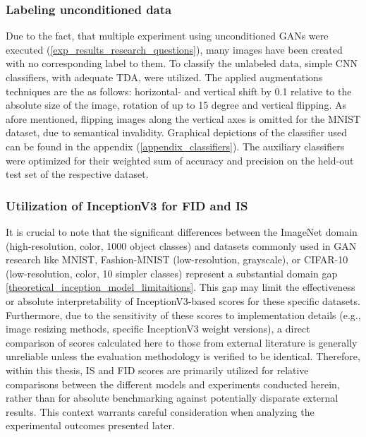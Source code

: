 \subsubsection{Labeling unconditioned data}\label{body_experiment_labeling_data}
Due to the fact, that multiple experiment using unconditioned GANs were executed (\ref{exp_results_research_questions}), many images have been created with no corresponding label to them. To classify the unlabeled data, simple CNN classifiers, with adequate TDA, were utilized. The applied augmentations techniques are the as follows: horizontal- and vertical shift by 0.1 relative to the absolute size of the image, rotation of up to 15 degree and vertical flipping. As afore mentioned, flipping images along the vertical axes is omitted for the MNIST dataset, due to semantical invalidity. Graphical depictions of the classifier used can be found in the appendix (\ref{appendix_classifiers}). The auxiliary classifiers were optimized for their weighted sum of accuracy and precision on the held-out test set of the respective dataset.\\


\subsubsection{Utilization of InceptionV3 for FID and IS}\label{body_experiment_inception_model}
It is crucial to note that the significant differences between the ImageNet domain (high-resolution, color, 1000 object classes) and datasets commonly used in GAN research like MNIST, Fashion-MNIST (low-resolution, grayscale), or CIFAR-10 (low-resolution, color, 10 simpler classes) represent a substantial domain gap \ref{theoretical_inception_model_limitaitions}. This gap may limit the effectiveness or absolute interpretability of InceptionV3-based scores for these specific datasets. Furthermore, due to the sensitivity of these scores to implementation details (e.g., image resizing methods, specific InceptionV3 weight versions), a direct comparison of scores calculated here to those from external literature is generally unreliable unless the evaluation methodology is verified to be identical. Therefore, within this thesis, IS and FID scores are primarily utilized for relative comparisons between the different models and experiments conducted herein, rather than for absolute benchmarking against potentially disparate external results. This context warrants careful consideration when analyzing the experimental outcomes presented later.


